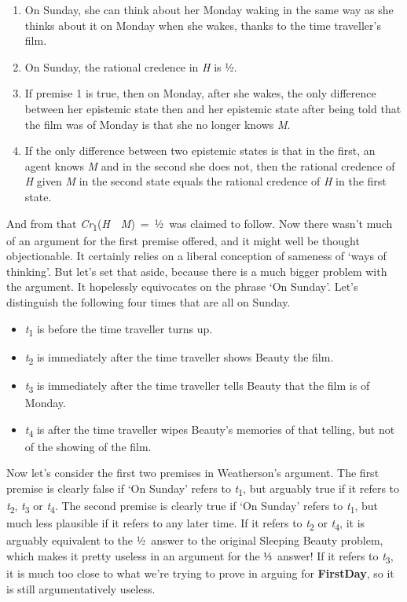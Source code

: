 \documentclass[
  11pt,
  letterpaper,
  DIV=11,
  numbers=noendperiod,
  twoside]{scrartcl}
\providecommand{\tightlist}{%
  \setlength{\itemsep}{0pt}\setlength{\parskip}{0pt}}\usepackage{longtable,booktabs,array}
\begin{document}
\begin{enumerate}
\def\labelenumi{\arabic{enumi}.}
\tightlist
\item
  On Sunday, she can think about her Monday waking in the same way as
  she thinks about it on Monday when she wakes, thanks to the time
  traveller's film.
\item
  On Sunday, the rational credence in \emph{H} is ½.
\item
  If premise 1 is true, then on Monday, after she wakes, the only
  difference between her epistemic state then and her epistemic state
  after being told that the film was of Monday is that she no longer
  knows \emph{M}.
\item
  If the only difference between two epistemic states is that in the
  first, an agent knows \emph{M} and in the second she does not, then
  the rational credence of \emph{H} given \emph{M} in the second state
  equals the rational credence of \emph{H} in the first state.
\end{enumerate}

And from that
\emph{Cr}\textsubscript{1}(\emph{H}~\textbar~\emph{M})~=~½~was claimed
to follow. Now there wasn't much of an argument for the first premise
offered, and it might well be thought objectionable. It certainly relies
on a liberal conception of sameness of `ways of thinking'. But let's set
that aside, because there is a much bigger problem with the argument. It
hopelessly equivocates on the phrase `On Sunday'. Let's distinguish the
following four times that are all on Sunday.

\begin{itemize}
\tightlist
\item
  \emph{t}\textsubscript{1} is before the time traveller turns up.
\item
  \emph{t}\textsubscript{2} is immediately after the time traveller
  shows Beauty the film.
\item
  \emph{t}\textsubscript{3} is immediately after the time traveller
  tells Beauty that the film is of Monday.
\item
  \emph{t}\textsubscript{4} is after the time traveller wipes Beauty's
  memories of that telling, but not of the showing of the film.
\end{itemize}

Now let's consider the first two premises in Weatherson's argument. The
first premise is clearly false if `On Sunday' refers to
\emph{t}\textsubscript{1}, but arguably true if it refers to
\emph{t}\textsubscript{2}, \emph{t}\textsubscript{3} or
\emph{t}\textsubscript{4}. The second premise is clearly true if `On
Sunday' refers to \emph{t}\textsubscript{1}, but much less plausible if
it refers to any later time. If it refers to \emph{t}\textsubscript{2}
or \emph{t}\textsubscript{4}, it is arguably equivalent to the ½~answer
to the original Sleeping Beauty problem, which makes it pretty useless
in an argument for the ⅓~answer! If it refers to
\emph{t}\textsubscript{3}, it is much too close to what we're trying to
prove in arguing for \textbf{FirstDay}, so it is still argumentatively
useless.
\end{document}
